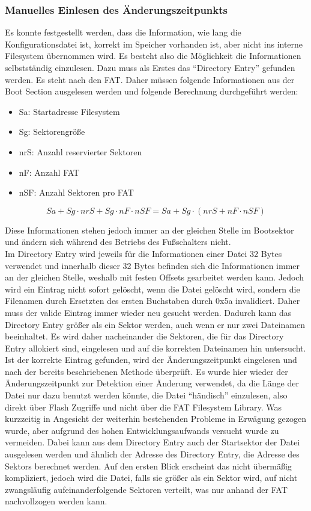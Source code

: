 \subsubsection{Manuelles Einlesen des Änderungszeitpunkts}
Es konnte festgestellt werden, dass die Information, wie lang die Konfigurationsdatei ist, korrekt im Speicher vorhanden ist, aber nicht ins interne Filesystem übernommen wird. Es besteht also die Möglichkeit die Informationen selbstständig einzulesen. Dazu muss als Erstes das ``Directory Entry'' gefunden werden. Es steht nach den \ac{FAT}. Daher müssen folgende Informationen aus der Boot Section ausgelesen werden und folgende Berechnung durchgeführt werden:
\begin{itemize}
    \item Sa: Startadresse Filesystem
    \item Sg: Sektorengröße
    \item nrS: Anzahl reservierter Sektoren
    \item nF: Anzahl \ac{FAT}
    \item nSF: Anzahl Sektoren pro \ac{FAT}
\end{itemize}

\[Sa + Sg \cdot nrS + Sg \cdot nF \cdot nSF = Sa + Sg\cdot(nrS + nF \cdot nSF)\]

Diese Informationen stehen jedoch immer an der gleichen Stelle im Bootsektor und ändern sich während des Betriebs des Fußschalters nicht. \\
Im Directory Entry wird jeweils für die Informationen einer Datei 32 Bytes verwendet und innerhalb dieser 32 Bytes befinden sich die Informationen immer an der gleichen Stelle, weshalb mit festen Offsets gearbeitet werden kann. Jedoch wird ein Eintrag nicht sofort gelöscht, wenn die Datei gelöscht wird, sondern die Filenamen durch Ersetzten des ersten Buchstaben durch 0x5a invalidiert. Daher muss der valide Eintrag immer wieder neu gesucht werden. Dadurch kann das Directory Entry größer als ein Sektor werden, auch wenn er nur zwei Dateinamen beeinhaltet. Es wird daher nacheinander die Sektoren, die für das Directory Entry allokiert sind, eingelesen und auf die korrekten Dateinamen hin untersucht. Ist der korrekte Eintrag gefunden, wird der Änderungszeitpunkt eingelesen und nach der bereits beschriebenen Methode überprüft. Es wurde hier wieder der Änderungszeitpunkt zur Detektion einer Änderung verwendet, da die Länge der Datei nur dazu benutzt werden könnte, die Datei ``händisch'' einzulesen, also direkt über Flash Zugriffe und nicht über die \ac{FAT} Filesystem Library. Was kurzzeitig in Angesicht der weiterhin bestehenden Probleme in Erwägung gezogen wurde, aber aufgrund des hohen Entwicklungsaufwands versucht wurde zu vermeiden. Dabei kann aus dem Directory Entry auch der Startsektor der Datei ausgelesen werden und ähnlich der Adresse des Directory Entry, die Adresse des Sektors berechnet werden. Auf den ersten Blick erscheint das nicht übermäßig kompliziert, jedoch wird die Datei, falls sie größer als ein Sektor wird, auf nicht zwangsläufig aufeinanderfolgende Sektoren verteilt, was nur anhand der \ac{FAT} nachvollzogen werden kann.

